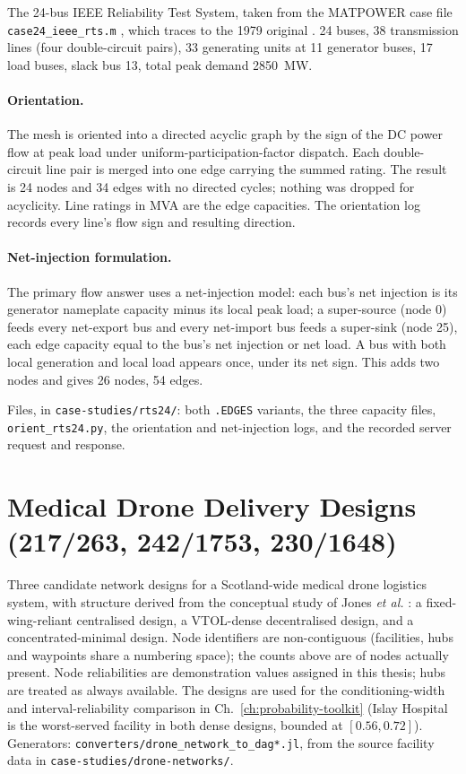 \documentclass[12pt]{report}
\providecommand{\filepath}[1]{\nolinkurl{#1}}
\begin{document}
The 24-bus IEEE Reliability Test System, taken from the MATPOWER case file
\filepath{case24_ieee_rts.m} \cite{zimmerman2011matpower}, which traces to the 1979
original \cite{ieee1979rts}. 24 buses, 38 transmission lines (four double-circuit pairs),
33 generating units at 11 generator buses, 17 load buses, slack bus 13, total peak demand
2850~MW.

\paragraph{Orientation.} The mesh is oriented into a directed acyclic graph by the sign of
the DC power flow at peak load under uniform-participation-factor dispatch. Each
double-circuit line pair is merged into one edge carrying the summed rating. The result is
24 nodes and 34 edges with no directed cycles; nothing was dropped for acyclicity. Line
ratings in MVA are the edge capacities. The orientation log records every line's flow sign
and resulting direction.

\paragraph{Net-injection formulation.} The primary flow answer uses a net-injection model:
each bus's net injection is its generator nameplate capacity minus its local peak load; a
super-source (node 0) feeds every net-export bus and every net-import bus feeds a
super-sink (node 25), each edge capacity equal to the bus's net injection or net load. A
bus with both local generation and local load appears once, under its net sign. This adds
two nodes and gives 26 nodes, 54 edges.

Files, in \filepath{case-studies/rts24/}: both \filepath{.EDGES} variants, the three
capacity files, \filepath{orient_rts24.py}, the orientation and net-injection logs, and
the recorded server request and response.

\section{Medical Drone Delivery Designs (217/263, 242/1753, 230/1648)}
\label{sec:appA-drone}

Three candidate network designs for a Scotland-wide medical drone logistics system, with
structure derived from the conceptual study of Jones \emph{et al.}
\cite{jones2025conceptual}: a fixed-wing-reliant centralised design, a VTOL-dense
decentralised design, and a concentrated-minimal design. Node identifiers are
non-contiguous (facilities, hubs and waypoints share a numbering space); the counts above
are of nodes actually present. Node reliabilities are demonstration values assigned in
this thesis; hubs are treated as always available. The designs are used for the
conditioning-width and interval-reliability comparison in
Ch.~\ref{ch:probability-toolkit} (Islay Hospital is the worst-served facility in both
dense designs, bounded at $[0.56, 0.72]$). Generators:
\filepath{converters/drone\_network\_to\_dag*.jl}, from the source facility data in
\filepath{case-studies/drone-networks/}.
\end{document}
